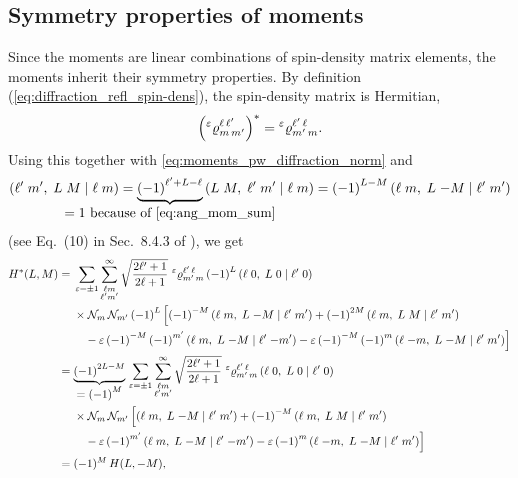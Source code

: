 \subsection{Symmetry properties of moments}%
\label{sec:diffraction:moments_sym}

Since the moments are linear combinations of spin-density matrix
elements, the moments inherit their symmetry properties.  By
definition (\confer \cref{eq:diffraction_refl_spin-dens}), the
spin-density matrix is Hermitian, \ie
\begin{equation}
  \rBrk{\prescript{\refl}{}{\varrho}^{\ell\, \ell'}_{m\, m'}}^*
  = \prescript{\refl}{}{\varrho}^{\ell'\, \ell}_{m'\, m}.
\end{equation}
Using this together with \cref{eq:moments_pw_diffraction_norm} and
\begin{equation}
  \label{eq:clebsch_sym}
  \clebsch{\ell'}{m'}{L}{M}{\ell}{m}
  = \cdUnderbrace{{(-1)}^{\ell' + L - \ell}}{= 1~\text{because of \cref{eq:ang_mom_sum}}}\, \clebsch{L}{M}{\ell'}{m'}{\ell}{m}
  = {(-1)}^{L - M}\, \clebsch{\ell}{m}{L}{-M}{\ell'}{m'}
\end{equation}
(see Eq.~(10) in Sec.~8.4.3 of ), we get
\begin{align}
  H^*(L, M)
  ={}& \begin{multlined}[t][0.8\textwidth]
    \sum_{\refl = \pm 1} \sum_{\substack{\ell m \\ \ell' m'}}^\infty
    \sqrt{\frac{2 \ell' + 1}{2 \ell + 1}}\,
    \prescript{\refl}{}{\varrho}^{\ell'\, \ell}_{m'\, m}\, {(-1)}^L\, \clebsch{\ell}{0}{L}{0}{\ell'}{0} \\
    \shoveleft{\times \mathcal{N}_m\, \mathcal{N}_{m'}\, {(-1)}^L\, \Big[
      {(-1)}^{-M}\, \clebsch{\ell}{m}{L}{-M}{\ell'}{m'}
      + {(-1)}^{2M}\, \clebsch{\ell}{m}{L}{M}{\ell'}{m'}} \\
      - \refl\, {(-1)}^{-M}\, {(-1)}^{m'}\, \clebsch{\ell}{m}{L}{-M}{\ell'}{-m'}
      - \refl\, {(-1)}^{-M}\, {(-1)}^m\, \clebsch{\ell}{-m}{L}{-M}{\ell'}{m'} \Big]
  \end{multlined} \notag
  \\
  ={}& \begin{multlined}[t][0.8\textwidth]
    \dUnderbrace{{(-1)}^{2 L - M}}{= {(-1)}^M}\, \sum_{\refl = \pm 1} \sum_{\substack{\ell m \\ \ell' m'}}^\infty
    \sqrt{\frac{2 \ell' + 1}{2 \ell + 1}}\,
    \prescript{\refl}{}{\varrho}^{\ell'\, \ell}_{m'\, m}\, \clebsch{\ell}{0}{L}{0}{\ell'}{0} \\
    \shoveleft{\times \mathcal{N}_m\, \mathcal{N}_{m'}\, \Big[
      \clebsch{\ell}{m}{L}{-M}{\ell'}{m'}
      + {(-1)}^{-M}\, \clebsch{\ell}{m}{L}{M}{\ell'}{m'}} \\
      - \refl\, {(-1)}^{m'}\, \clebsch{\ell}{m}{L}{-M}{\ell'}{-m'}
      - \refl\, {(-1)}^m\, \clebsch{\ell}{-m}{L}{-M}{\ell'}{m'} \Big]
  \end{multlined} \notag
  \\
  \label{eq:diffraction_moment_sym_1}
  ={}& (-1)^M\, H(L, -M),
\end{align}
